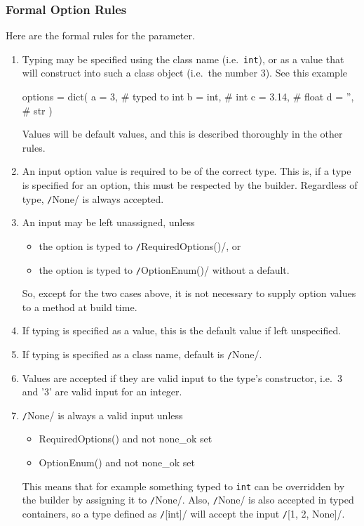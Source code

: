\subsubsection{Formal Option Rules}
Here are the formal rules for the \options parameter.
\begin{enumerate}

\item Typing may be specified using the class name (i.e.\ \texttt{int}), or as
  a value that will construct into such a class object (i.e.\ the
  number 3).  See this example
  \begin{python}
options = dict(
    a = 3,     # typed to int
    b = int,   #          int
    c = 3.14,  #          float
    d = '',    #          str
)
  \end{python}
  Values will be default values, and this is described thoroughly in
  the other rules.

 \item An input option value is required to be of the correct type.
   This is, if a type is specified for an option, this must be
   respected by the builder.  Regardless of type,
   \texttt/None/ is always accepted.

\item An input may be left unassigned, unless
  \begin{itemize}
  \item the option is typed to \texttt/RequiredOptions()/, or
  \item the option is typed to \texttt/OptionEnum()/ without a default.
  \end{itemize}
  So, except for the two cases above, it is not necessary to supply
  option values to a method at build time.

\item If typing is specified as a value, this is the default value if
  left unspecified.

\item If typing is specified as a class name, default is
  \texttt/None/.

\item Values are accepted if they are valid input to the type's
  constructor, i.e.\ 3 and '3' are valid input for an integer.

\item \texttt/None/ is always a valid input unless
  \begin{itemize}
  \item RequiredOptions() and not none\_ok set
  \item OptionEnum() and not none\_ok set
  \end{itemize}
  This means that for example something typed to \texttt{int} can be
  overridden by the builder by assigning it to
  \texttt/None/.  Also, \texttt/None/ is also
  accepted in typed containers, so a type defined as
  \texttt/[int]/ will accept the input
  \texttt/[1, 2, None]/.


\end{enumerate}
